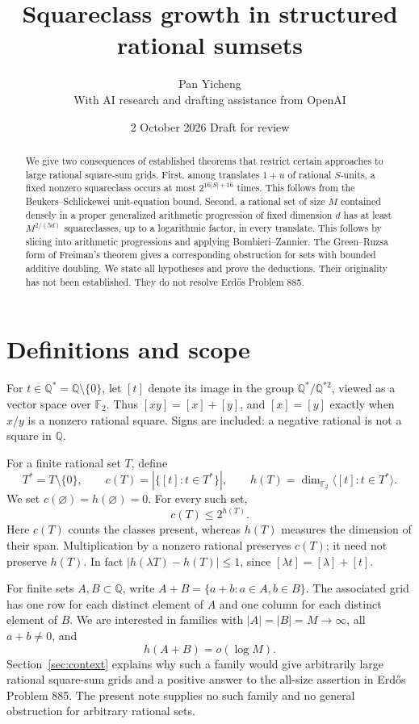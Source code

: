 \documentclass[11pt,letterpaper]{article}
\title{\bfseries Squareclass growth in structured rational sumsets}
\author{Pan Yicheng\\[3pt]\small With AI research and drafting assistance from OpenAI}
\date{2 October 2026 \quad Draft for review}
\theoremstyle{remark}\newtheorem{remark}[theorem]{Remark}
\newcommand{\Q}{\mathbb Q}
\newcommand{\F}{\mathbb F}
\begin{document}
\maketitle
\begin{abstract}
We give two consequences of established theorems that restrict certain approaches to large rational square-sum grids. First, among translates $1+u$ of rational $S$-units, a fixed nonzero squareclass occurs at most $2^{16|S|+16}$ times. This follows from the Beukers--Schlickewei unit-equation bound. Second, a rational set of size $M$ contained densely in a proper generalized arithmetic progression of fixed dimension $d$ has at least $M^{2/(5d)}$ squareclasses, up to a logarithmic factor, in every translate. This follows by slicing into arithmetic progressions and applying Bombieri--Zannier. The Green--Ruzsa form of Freiman's theorem gives a corresponding obstruction for sets with bounded additive doubling. We state all hypotheses and prove the deductions. Their originality has not been established. They do not resolve Erd\H{o}s Problem 885.
\end{abstract}

\section{Definitions and scope}
For $t\in\Q^*=\Q\setminus\{0\}$, let $[t]$ denote its image in the group $\Q^*/\Q^{*2}$, viewed as a vector space over $\F_2$. Thus $[xy]=[x]+[y]$, and $[x]=[y]$ exactly when $x/y$ is a nonzero rational square. Signs are included: a negative rational is not a square in $\Q$.

For a finite rational set $T$, define
\[
 T^*=T\setminus\{0\},\qquad
 c(T)=|\{[t]:t\in T^*\}|,\qquad
 h(T)=\dim_{\F_2}\langle[t]:t\in T^*\rangle.
\]
We set $c(\varnothing)=h(\varnothing)=0$. For every such set,
\begin{equation}\label{eq:colors}
 c(T)\le 2^{h(T)}.
\end{equation}
Here $c(T)$ counts the classes present, whereas $h(T)$ measures the dimension of their span. Multiplication by a nonzero rational preserves $c(T)$; it need not preserve $h(T)$. In fact $|h(\lambda T)-h(T)|\le1$, since $[\lambda t]=[\lambda]+[t]$.

For finite sets $A,B\subset\Q$, write $A+B=\{a+b:a\in A,b\in B\}$. The associated grid has one row for each distinct element of $A$ and one column for each distinct element of $B$. We are interested in families with $|A|=|B|=M\to\infty$, all $a+b\ne0$, and
\begin{equation}\label{eq:target}
 h(A+B)=o(\log M).
\end{equation}
Section~\ref{sec:context} explains why such a family would give arbitrarily large rational square-sum grids and a positive answer to the all-size assertion in Erd\H{o}s Problem 885. The present note supplies no such family and no general obstruction for arbitrary rational sets.
\end{document}
